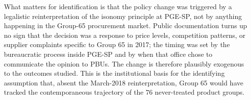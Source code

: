 What matters for identification is that the policy change was triggered by a legalistic reinterpretation of the isonomy principle at PGE-SP, not by anything happening in the Group-65 procurement market. Public documentation turns up no sign that the decision was a response to price levels, competition patterns, or supplier complaints specific to Group 65 in 2017; the timing was set by the bureaucratic process inside PGE-SP and by when that office chose to communicate the opinion to PBUs. The change is therefore plausibly exogenous to the outcomes studied. This is the institutional basis for the identifying assumption that, absent the March-2018 reinterpretation, Group 65 would have tracked the contemporaneous trajectory of the 76 never-treated product groups.
